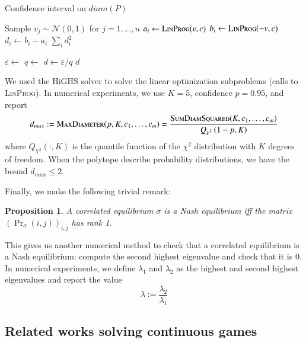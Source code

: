 \documentclass[preprint,12pt,authoryear]{elsarticle}
\newtheorem{proposition}[theorem]{Proposition}
\theoremstyle{definition}
\begin{document}
\begin{algorithm}
\label{alg:diameters}
\caption{Confidence interval on $diam(P)$}
\begin{algorithmic}
    \State Sample $v_j \sim \mathcal{N}(0, 1)$ for $j=1,\ldots,n$
    \State $a_i \gets \textsc{LinProg}(v, c)$ 
    \State $b_i \gets \textsc{LinProg}(-v, c)$ 
    \State $d_i \gets b_i - a_i$
\EndFor
\State \Return $\sum_i d_i^2$
\EndFunction
{}

\State $\varepsilon \gets$ 
\State $q \gets$ 
\State $d \gets \varepsilon / q$
\State \Return $d$
\EndFunction
\end{algorithmic}
\end{algorithm}

We used the HiGHS solver \citep{huangfu2018parallelizing} to solve the linear optimization subproblems (calls to \textsc{LinProg}). In numerical experiments, we use $K=5$, confidence $p=0.95$, and report $$d_{max} :=  \textsc{MaxDiameter}(p, K, c_1, \ldots, c_m) = \frac{\textsc{SumDiamSquared}(K, c_1, \ldots, c_m)} {Q_{\chi^2}\left(1-p, K\right)}$$ where $Q_{\chi^2}(\cdot, K)$ is the quantile function of the $\chi^2$ distribution with $K$ degrees of freedom. When the polytope describe probability distributions, we have the bound $d_{max} \leq 2$.

Finally, we make the following trivial remark:

\begin{proposition}
    A correlated equilibrium $\sigma$ is a Nash equilibrium iff the matrix $(\Pr\nolimits_\sigma(i, j))_{i,j}$ has rank 1.
\end{proposition}

This gives us another numerical method to check that a correlated equilibrium is a Nash equilibrium: compute the second highest eigenvalue and check that it is $0$. In numerical experiments, we define $\lambda_1$ and $\lambda_2$ as the highest and second highest eigenvalues and report the value $$\lambda := \frac{\lambda_2}{\lambda_1}$$

\subsection{Related works solving continuous games}
\end{document}

